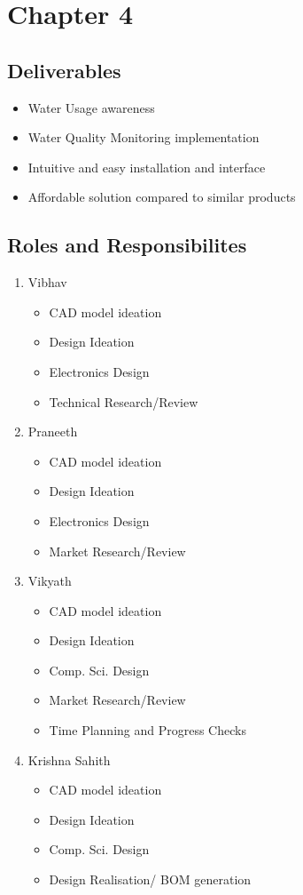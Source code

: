 \chapter{Chapter 4}
\graphicspath{{Chapter4/}}
\section{Deliverables}
\begin{itemize}
	\item Water Usage awareness
	\item Water Quality Monitoring implementation
	\item Intuitive and easy installation and interface
	\item Affordable solution compared to similar products
\end{itemize}

\section{Roles and Responsibilites}
\begin{enumerate}
	\item Vibhav\begin{itemize}
		\item CAD model ideation
		\item Design Ideation
		\item Electronics Design
		\item Technical Research/Review
	\end{itemize}
	\item Praneeth\begin{itemize}
		\item CAD model ideation	
			\item Design Ideation
		\item Electronics Design
		\item Market Research/Review
	\end{itemize}
	\item Vikyath\begin{itemize}
		\item CAD model ideation	
			\item Design Ideation
		\item Comp. Sci. Design
		\item Market Research/Review
		\item Time Planning and Progress Checks
	\end{itemize}
	\item Krishna Sahith\begin{itemize}
		\item CAD model ideation	
			\item Design Ideation
		\item Comp. Sci. Design
		\item Design Realisation/ BOM generation
	\end{itemize}

\end{enumerate}
